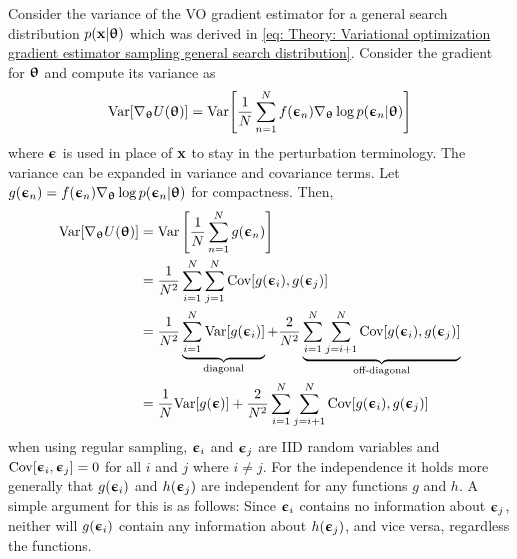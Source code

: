 Consider the variance of the \gls{VO} gradient estimator for a general search distribution $p({\mathbf{x}}|{\boldsymbol{\uptheta}})$ which was derived in \eqref{eq: Theory: Variational optimization gradient estimator sampling general search distribution}. Consider the gradient for ${\boldsymbol{\uptheta}}$ and compute its variance as
\begin{align}
    \text{Var}{\left[\nabla_{\boldsymbol{\uptheta}}U({\boldsymbol{\uptheta}})\right]} = \text{Var}{\left[\frac{1}{N}\sum_{n=1}^N f({\boldsymbol{\upepsilon}}_n) \nabla_{\boldsymbol{\uptheta}}\log p({\boldsymbol{\upepsilon}}_n|{\boldsymbol{\uptheta}})\right]}
\end{align}
where ${\boldsymbol{\upepsilon}}$ is used in place of ${\mathbf{x}}$ to stay in the perturbation terminology. The variance can be expanded in variance and covariance terms. Let $g({\boldsymbol{\upepsilon}}_n) = f({\boldsymbol{\upepsilon}}_n) \nabla_{\boldsymbol{\uptheta}}\log p({\boldsymbol{\upepsilon}}_n|{\boldsymbol{\uptheta}})$ for compactness. Then,
\begin{align} %
    \text{Var}\bra{\nabla_\thetab U(\thetab)} 
    &= \text{Var}\left[\frac{1}{N}\sum_{n=1}^N g(\epsilonb_n)\right]\nonumber\\
    &= \frac{1}{N^2}\sum_{i=1}^N\sum_{j=1}^N\text{Cov}\bra{g(\epsilonb_i),g(\epsilonb_j)}\nonumber\\
    &= \frac{1}{N^2}
    \underbrace{\sum_{i=1}^N \text{Var}\bra{g(\epsilonb_i)}}_\text{diagonal} + \frac{2}{N^2}
    \underbrace{\sum_{i=1}^N\sum_{j=i+1}^N\text{Cov}\bra{g(\epsilonb_i), g(\epsilonb_j)}}_\text{off-diagonal}\label{eq: Theory: Variance of multivariate Gaussian variational optimization gradient estimator no matter the sampling}\\
    &= \frac{1}{N}\text{Var}\bra{g(\epsilonb)} + \frac{2}{N^2}\sum_{i=1}^N\sum_{j=i+1}^N\text{Cov}\bra{g(\epsilonb_i), g(\epsilonb_j)}\label{eq: Theory: Variance of multivariate Gaussian variational optimization gradient estimator regular samplng}
\end{align}
when using regular sampling, ${\boldsymbol{\upepsilon}}_i$ and ${\boldsymbol{\upepsilon}}_j$ are \gls{IID} random variables and $\text{Cov}{\left[{\boldsymbol{\upepsilon}}_i,{\boldsymbol{\upepsilon}}_j\right]}=0$ for all $i$ and $j$ where $i\ne j$. For the independence it holds more generally that $g({\boldsymbol{\upepsilon}}_i)$ and $h({\boldsymbol{\upepsilon}}_j)$ are independent for any functions $g$ and $h$. A simple argument for this is as follows: Since ${\boldsymbol{\upepsilon}}_i$ contains no information about ${\boldsymbol{\upepsilon}}_j$, neither will $g({\boldsymbol{\upepsilon}}_i)$ contain any information about $h({\boldsymbol{\upepsilon}}_j)$, and vice versa, regardless the functions.
